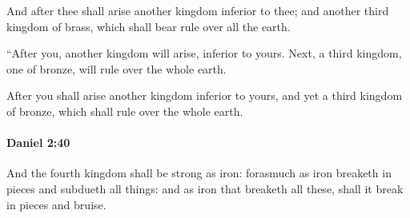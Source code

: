 			\begin{versebox}
					\item[BHS] 
					\item[LXX] 
					\item[ASV] And after thee shall arise another kingdom inferior to thee; and another third kingdom of brass, which shall bear rule over all the earth.
					\item[NIV] “After you, another kingdom will arise, inferior to yours. Next, a third kingdom, one of bronze, will rule over the whole earth.
					\item[NRSV] After you shall arise another kingdom inferior to yours, and yet a third kingdom of bronze, which shall rule over the whole earth.
			\end{versebox}

		\paragraph{Daniel 2:40} %
			\label{DANIEL-2-40}

			And the fourth kingdom shall be strong as iron: forasmuch as iron breaketh in pieces and subdueth all things: and as iron that breaketh all these, shall it break in pieces and bruise.

